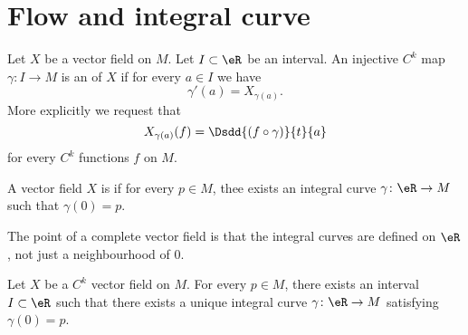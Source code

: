 \section{Flow and integral curve}

\begin{definition}      \label{DEFooWTNZooTbxJAH}
    Let \( X\) be a vector field on \( M\). Let \( I\subset \eR\) be an interval. An injective \( C^k\) map \( \gamma\colon I\to M\) is an  of \( X\) if for every \( a\in I\) we have
    \begin{equation}
        \gamma'(a)=X_{\gamma(a)}.
    \end{equation}
    More explicitly we request that
    \begin{equation}       
        X_{\gamma(a)}(f)=\Dsdd{ (f\circ \gamma) }{t}{a}
    \end{equation}
    for every \( C^k\) functions \( f\) on \( M\).
\end{definition}

\begin{definition}
    A vector field \( X\) is  if for every \( p\in M\), thee exists an integral curve \( \gamma\colon \eR\to M\) such that \( \gamma(0)=p\).
\end{definition}

The point of a complete vector field is that the integral curves are defined on \( \eR\), not just a neighbourhood of \( 0\).

\begin{proposition}     \label{PROPooZOOCooExoXOv}
    Let \( X\) be a \( C^k\) vector field on \( M\). For every \( p\in M\), there exists an interval \( I\subset \eR\) such that there exists a unique integral curve \( \gamma\colon \eR\to M\) satisfying \( \gamma(0)=p\).
\end{proposition}

